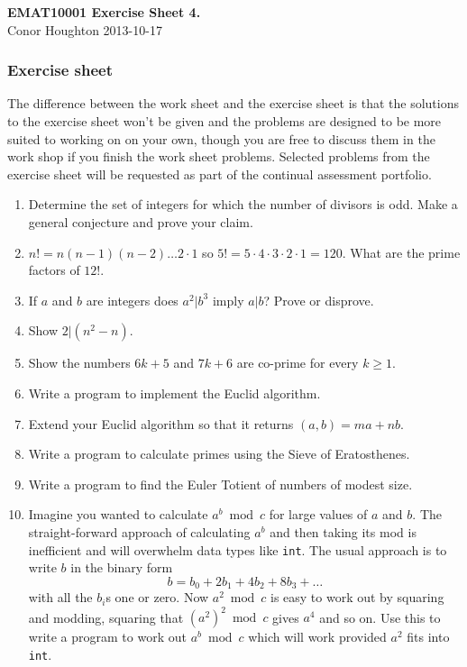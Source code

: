 \documentclass[12pt]{article}
\begin{document}
\begin{center}
{\bf EMAT10001 Exercise Sheet 4.}\\[1cm]{} Conor Houghton 2013-10-17
\end{center}

\subsubsection*{Exercise sheet}

The difference between the work sheet and the exercise sheet is that
the solutions to the exercise sheet won't be given and the problems
are designed to be more suited to working on on your own, though you
are free to discuss them in the work shop if you finish the work sheet
problems. Selected problems from the exercise sheet will be requested
as part of the continual assessment portfolio.

\begin{enumerate}

\item Determine the set of integers for which the number of divisors is odd. Make a general conjecture and prove your claim.

\item $n!=n(n-1)(n-2)\ldots 2\cdot 1$ so $5!=5\cdot 4\cdot 3\cdot
  2\cdot 1=120$. What are the prime factors of $12!$.

\item If $a$ and $b$ are integers does $a^2|b^3$ imply $a|b$? Prove or disprove.

\item Show $2|(n^2-n)$.

\item Show the numbers $6k+5$ and $7k+6$ are co-prime for every $k\ge 1$.

\item Write a program to implement the Euclid algorithm.

\item Extend your Euclid algorithm  so that it returns $(a,b)=ma+nb$.

\item Write a program to calculate primes using the Sieve of Eratosthenes.

\item Write a program to find the Euler Totient of numbers of modest size. 

\item Imagine you wanted to calculate $a^b\bmod c$ for large values of
  $a$ and $b$. The straight-forward approach of calculating $a^b$ and
  then taking its mod is inefficient and will overwhelm data types
  like \texttt{int}. The usual approach is to write $b$ in the binary form
\begin{equation}
b=b_0+2b_1+4b_2+8b_3+\ldots
\end{equation}
with all the $b_i$s one or zero. Now $a^2\bmod c$ is easy to work out
by squaring and modding, squaring that $(a^2)^2\bmod c$ gives $a^4$
and so on. Use this to write a program to work out $a^b\bmod c$ which
will work provided $a^2$ fits into \texttt{int}.

\end{enumerate}
\end{document}
